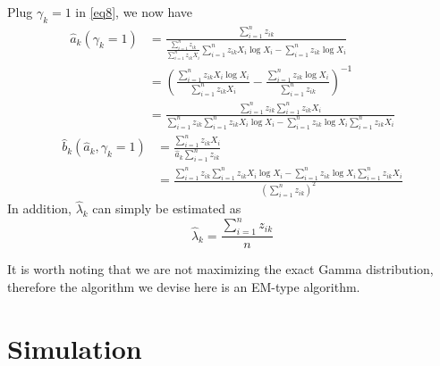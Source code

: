 \documentclass[
  letterpaper,
  DIV=11,
  numbers=noendperiod,
  oneside]{scrreprt}
\begin{document}
Plug \({\gamma_k}=1\) in \eqref{eq8}, we now have \begin{align}
  \hat a_k ({\gamma_k}=1)&=\displaystyle\frac{\displaystyle\sum^{n}_{i=1}z_{ik}}{\displaystyle\frac {\displaystyle\sum^{n}_{i=1}z_{ik}}{\displaystyle\sum^{n}_{i=1}z_{ik}X_i}\sum^{n}_{i=1}z_{ik}X_i  \log X_i-\sum^{n}_{i=1}z_{ik}\log X_i}\nonumber\\
  &=\left(\frac {\sum^{n}_{i=1}z_{ik}X_i\log X_i}{\sum^{n}_{i=1}z_{ik}X_i}-\frac{\sum^{n}_{i=1}z_{ik}\log X_i}{\sum^{n}_{i=1}z_{ik}}\right)^{-1}\nonumber\\
  &=\frac{\displaystyle\sum^{n}_{i=1}z_{ik}\displaystyle\sum^{n}_{i=1}z_{ik}X_i}{\displaystyle\sum^{n}_{i=1}z_{ik}\displaystyle\sum^{n}_{i=1}z_{ik}X_i\log X_i-\displaystyle\sum^{n}_{i=1}z_{ik}\log X_i\displaystyle\sum^{n}_{i=1}z_{ik}X_i}\label{eq:ak}
  \end{align} \begin{align}
        \hat b_k(\hat a_k,{\gamma_k}=1)&=\frac{\displaystyle\sum^{n}_{i=1}z_{ik}X_i}{\hat a_k\displaystyle\sum^{n}_{i=1}z_{ik}} \nonumber\\
        &=\frac{\displaystyle\sum^{n}_{i=1}z_{ik}\displaystyle\sum^{n}_{i=1}z_{ik}X_i\log X_i-\displaystyle\sum^{n}_{i=1}z_{ik}\log X_i\displaystyle\sum^{n}_{i=1}z_{ik}X_i}{\left(\displaystyle\sum^{n}_{i=1}z_{ik}\right)^2} \label{eq:bk}
  \end{align} In addition, \(\hat {\lambda}_k\) can simply be estimated
as \begin{equation}
    \hat {\lambda}_k =\frac{\displaystyle\sum^{n}_{i=1}z_{ik}}{n} \label{eq:lambdak}
 \end{equation}

It is worth noting that we are not maximizing the exact Gamma
distribution, therefore the algorithm we devise here is an EM-type
algorithm.

\hypertarget{simulation}{%
\section{Simulation}\label{simulation}}
\end{document}

